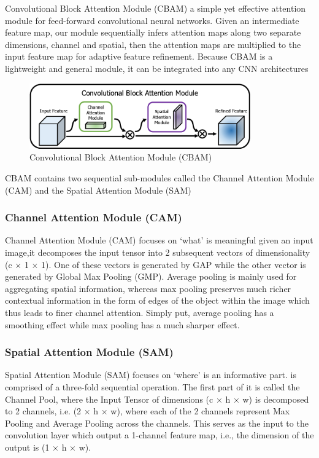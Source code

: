Convolutional Block Attention Module (CBAM)
a simple yet effective attention module for feed-forward convolutional
neural networks. Given an intermediate feature map, our module sequentially infers attention maps along two separate dimensions, channel
and spatial, then the attention maps are multiplied to the input feature
map for adaptive feature refinement. Because CBAM is a lightweight and
general module, it can be integrated into any CNN architectures\cite{art44}
\begin{figure}[H]
    \centering
    \includegraphics[width=0.85\textwidth]{chapters/chapter02/fig02/cbam.PNG}
    \caption{Convolutional Block Attention Module (CBAM)}
\end{figure}
CBAM contains two sequential sub-modules called the Channel Attention Module (CAM) and the Spatial Attention Module (SAM)
\subsubsection{Channel Attention Module (CAM)}
Channel Attention Module (CAM) focuses on ‘what’ is
meaningful given an input image,it
decomposes the input tensor into 2 subsequent vectors of dimensionality (c × 1 × 1). One of these vectors is generated by GAP while the other vector is generated by Global Max Pooling (GMP). Average pooling is mainly used for aggregating spatial information, whereas max pooling preserves much richer contextual information in the form of edges of the object within the image which thus leads to finer channel attention. Simply put, average pooling has a smoothing effect while max pooling has a much sharper effect.\cite{art44}
\subsubsection{Spatial Attention Module (SAM)}
Spatial Attention Module (SAM) focuses on ‘where’ is an informative part. is comprised of a three-fold sequential operation. The first part of it is called the Channel Pool, where the Input Tensor of dimensions (c × h × w) is decomposed to 2 channels, i.e. (2 × h × w), where each of the 2 channels represent Max Pooling and Average Pooling across the channels. This serves as the input to the convolution layer which output a 1-channel feature map, i.e., the dimension of the output is (1 × h × w).\cite{art44}

